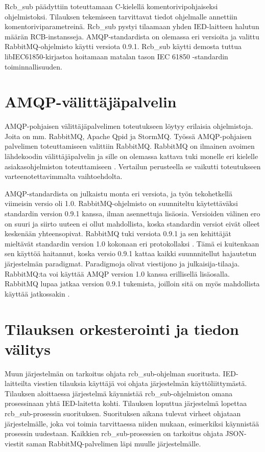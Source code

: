 Rcb\_sub päädyttiin toteuttamaan C-kielellä komentorivipohjaiseksi ohjelmistoksi. Tilauksen tekemiseen tarvittavat tiedot ohjelmalle annettiin komentoriviparametreinä. Rcb\_sub pystyi tilaamaan yhden IED-laitteen halutun määrän RCB-instansseja. AMQP-standardista on olemassa eri versioita ja valittu RabbitMQ-ohjelmisto käytti versiota 0.9.1. Rcb\_sub käytti demosta tuttua libIEC61850-kirjastoa hoitamaan matalan tason IEC 61850 -stan\-dar\-din toiminnallisuuden.


\section{AMQP-välittäjäpalvelin}
AMQP-pohjaisen välittäjäpalvelimen toteutukseen löytyy erilaisia ohjelmistoja. Joita on mm. RabbitMQ, Apache Qpid ja StormMQ. Työssä AMQP-pohjaisen palvelimen toteuttamiseen valittiin RabbitMQ. RabbitMQ on ilmainen avoimen lähdekoodin välittäjäpalvelin ja sille on olemassa kattava tuki monelle eri kielelle asiakasohjelmiston toteuttamiseen \cite{rabbitmq-supported-languages}. Vertailun perusteella se vaikutti toteutukseen varteenotettavimmalta vaihtoehdolta.

AMQP-standardista on julkaistu monta eri versiota, ja työn tekohetkellä viimeisin versio oli 1.0. RabbitMQ-ohjelmisto on suunniteltu käytettäväksi standardin version 0.9.1 kanssa, ilman asennettuja lisäosia. Versioiden välinen ero on suuri ja siirto uuteen ei ollut mahdollista, koska standardin versiot eivät olleet keskenään yhteensopivat. RabbitMQ tuki versiota 0.9.1 ja sen kehittäjät mieltävät standardin version 1.0 kokonaan eri protokollaksi \cite{RabbitMQ-Compatibility-and-Conformance}. Tämä ei kuitenkaan sen käyttöä haitannut, koska versio 0.9.1 kattaa kaikki suunnnitellut hajautetun järjestelmän paradigmat. Paradigmoja olivat viestijono ja julkaisija-tilaaja. RabbitMQ:ta voi käyttää AMQP version 1.0 kanssa erillisellä lisäosalla. RabbitMQ lupaa jatkaa version 0.9.1 tukemista, joilloin sitä on myös mahdollista käyttää jatkossakin \cite{RabbitMQ-Compatibility-and-Conformance}.


\section{Tilauksen orkesterointi ja tiedon välitys}
Muun järjestelmän on tarkoitus ohjata rcb\_sub-ohjelman suoritusta. IED-laitteilta viestien tilauksia käyttäjä voi ohjata järjestelmän käyttöliittymästä. Tilauksen aloittaessa järjestelmä käynnistää rcb\_sub-ohjelmiston omana prosessinaan yhtä IED-laitetta kohti. Tilauksen loputtua järjestelmä lopettaa rcb\_sub-prosessin suorituksen. Suorituksen aikana tulevat virheet ohjataan järjestelmälle, joka voi toimia tarvittaessa niiden mukaan, esimerkiksi käynnistää prosessin uudestaan. Kaikkien rcb\_sub-prosessien on tarkoitus ohjata JSON-viestit saman RabbitMQ-palvelimen läpi muulle järjestelmälle.

